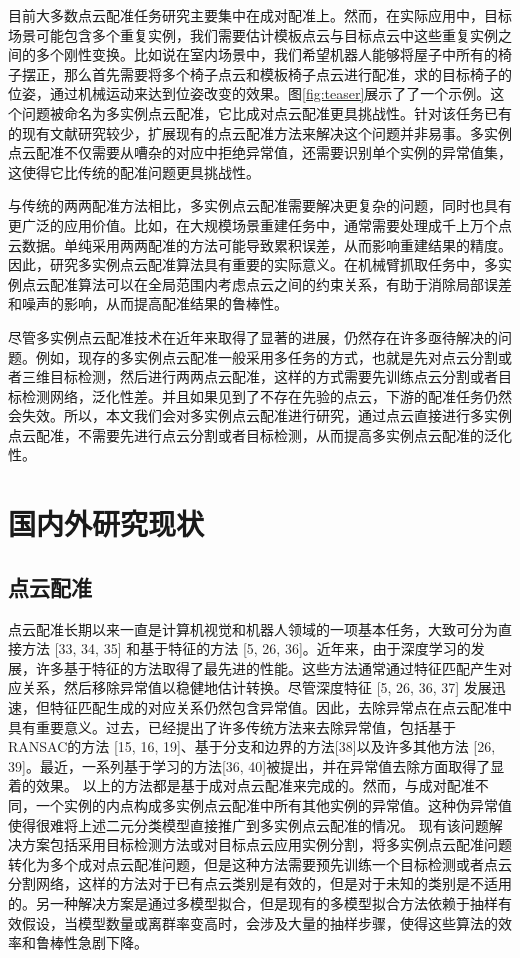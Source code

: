目前大多数点云配准任务研究主要集中在成对配准上。然而，在实际应用中，目标场景可能包含多个重复实例，我们需要估计模板点云与目标点云中这些重复实例之间的多个刚性变换。比如说在室内场景中，我们希望机器人能够将屋子中所有的椅子摆正，那么首先需要将多个椅子点云和模板椅子点云进行配准，求的目标椅子的位姿，通过机械运动来达到位姿改变的效果。图\ref{fig:teaser}展示了了一个示例。这个问题被命名为多实例点云配准，它比成对点云配准更具挑战性。针对该任务已有的现有文献研究较少，扩展现有的点云配准方法来解决这个问题并非易事。多实例点云配准不仅需要从嘈杂的对应中拒绝异常值，还需要识别单个实例的异常值集，这使得它比传统的配准问题更具挑战性。

与传统的两两配准方法相比，多实例点云配准需要解决更复杂的问题，同时也具有更广泛的应用价值。比如，在大规模场景重建任务中，通常需要处理成千上万个点云数据。单纯采用两两配准的方法可能导致累积误差，从而影响重建结果的精度。因此，研究多实例点云配准算法具有重要的实际意义。在机械臂抓取任务中，多实例点云配准算法可以在全局范围内考虑点云之间的约束关系，有助于消除局部误差和噪声的影响，从而提高配准结果的鲁棒性\cite{stuckler2012robust}。

尽管多实例点云配准技术在近年来取得了显著的进展，仍然存在许多亟待解决的问题。例如，现存的多实例点云配准一般采用多任务的方式，也就是先对点云分割或者三维目标检测，然后进行两两点云配准，这样的方式需要先训练点云分割或者目标检测网络，泛化性差。并且如果见到了不存在先验的点云，下游的配准任务仍然会失效。所以，本文我们会对多实例点云配准进行研究，通过点云直接进行多实例点云配准，不需要先进行点云分割或者目标检测，从而提高多实例点云配准的泛化性。


\section{国内外研究现状}

\subsection{点云配准}
点云配准长期以来一直是计算机视觉和机器人领域的一项基本任务，大致可分为直接方法 [33, 34, 35] 和基于特征的方法 [5, 26, 36]。近年来，由于深度学习的发展，许多基于特征的方法取得了最先进的性能。这些方法通常通过特征匹配产生对应关系，然后移除异常值以稳健地估计转换。尽管深度特征 [5, 26, 36, 37] 发展迅速，但特征匹配生成的对应关系仍然包含异常值。因此，去除异常点在点云配准中具有重要意义。过去，已经提出了许多传统方法来去除异常值，包括基于RANSAC的方法 [15, 16, 19]、基于分支和边界的方法[38]以及许多其他方法 [26, 39]。最近，一系列基于学习的方法[36, 40]被提出，并在异常值去除方面取得了显着的效果。
以上的方法都是基于成对点云配准来完成的。然而，与成对配准不同，一个实例的内点构成多实例点云配准中所有其他实例的异常值。这种伪异常值使得很难将上述二元分类模型直接推广到多实例点云配准的情况。
现有该问题解决方案包括采用目标检测方法或对目标点云应用实例分割，将多实例点云配准问题转化为多个成对点云配准问题，但是这种方法需要预先训练一个目标检测或者点云分割网络，这样的方法对于已有点云类别是有效的，但是对于未知的类别是不适用的。另一种解决方案是通过多模型拟合，但是现有的多模型拟合方法依赖于抽样有效假设，当模型数量或离群率变高时，会涉及大量的抽样步骤，使得这些算法的效率和鲁棒性急剧下降。

